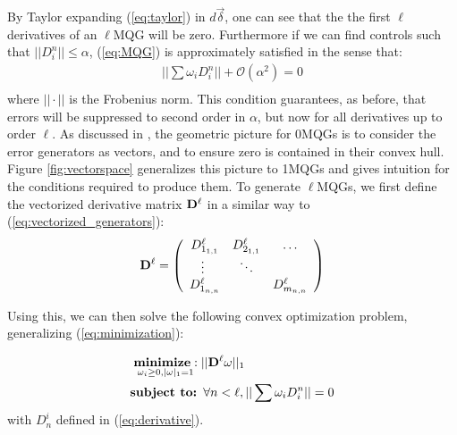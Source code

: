 \documentclass[aps,nofootinbib,pra,notitlepage,twocolumn]{revtex4-1}
\begin{document}
By Taylor expanding (\ref{eq:taylor}) in $d\vec{\delta}$, one can see that the the first $\ell$ derivatives of an $\ell$MQG will be zero. Furthermore if we can find controls such that $||D_i^n||\leq\alpha$, (\ref{eq:MQG}) is approximately satisfied in the sense that:
\begin{equation}\label{eq:MQG-relaxed}
\begin{gathered}
||\sum\omega_iD^n_i||+ \mathcal{O}(\alpha^2) = 0\\
\end{gathered}
\end{equation}
where $||\cdot||$ is the Frobenius norm. This condition guarantees, as before, that errors will be suppressed to second order in $\alpha$, but now for all derivatives up to order $\ell$. %
As discussed in \cite{Campbell2017}, the geometric picture for 0MQGs is to consider the error generators as vectors, and to ensure zero is contained in their convex hull. Figure \ref{fig:vectorspace} generalizes this picture to 1MQGs and gives intuition for the conditions required to produce them. To generate $\ell$MQGs, we first define the vectorized derivative matrix ${\bold{D}^{\ell}}$ in a similar way to (\ref{eq:vectorized_generators}):
\begin{equation}
{\bold{D}^{\ell}} =  \left(\begin{array}{cccc}
		D^\ell_{1_{1,1}} & D^\ell_{2_{1,1}} & \ldots   \\ 
		\vdots\ & \ddots &    \\
		D^\ell_{1_{n,n}} &  &  D^\ell_{m_{n,n}} \\ 
	\end{array} 	
	\right)
\end{equation}

Using this, we can then solve the following convex optimization problem, generalizing (\ref{eq:minimization}):

\begin{equation}\label{eq:robust_minimization}
  \begin{split}
    &\underset{\omega_i\geq0, |\omega|_1=1}{\textbf{minimize}: } ||{\bold{D}^{\ell}}\omega||_1\\
    &\textbf{subject to: } \forall n<\ell, ||\sum \omega_iD_i^n||=0\\
  \end{split}
\end{equation}
with $D_n^i$ defined in (\ref{eq:derivative}). 
\end{document}
